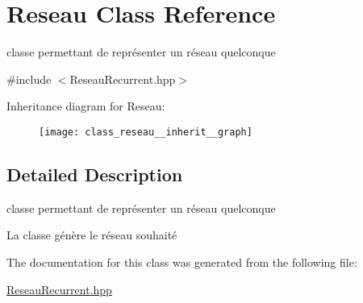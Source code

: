 \hypertarget{class_reseau}{}\section{Reseau Class Reference}
\label{class_reseau}


classe permettant de représenter un réseau quelconque  




{\ttfamily \#include $<$Reseau\+Recurrent.\+hpp$>$}



Inheritance diagram for Reseau\+:
\nopagebreak
\begin{figure}[H]
\begin{center}
\leavevmode
\texttt{[image: class\_reseau\_\_inherit\_\_graph]}
\end{center}
\end{figure}


\subsection{Detailed Description}
classe permettant de représenter un réseau quelconque 

La classe génère le réseau souhaité 

The documentation for this class was generated from the following file\+:\begin{DoxyCompactItemize}
\item 
\hyperlink{_reseau_recurrent_8hpp}{Reseau\+Recurrent.\+hpp}\end{DoxyCompactItemize}
